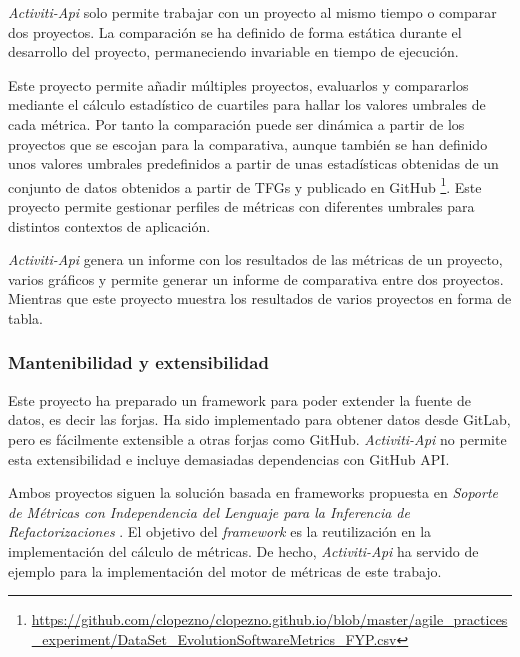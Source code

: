 \textit{Activiti-Api} solo permite trabajar con un proyecto al mismo tiempo o comparar dos proyectos. La comparación se ha definido de forma estática durante el desarrollo del proyecto, permaneciendo invariable en tiempo de ejecución.

Este proyecto permite añadir múltiples proyectos, evaluarlos y compararlos mediante el cálculo estadístico de cuartiles para hallar los valores umbrales de cada métrica. Por tanto la comparación puede ser dinámica a partir de los proyectos que se escojan para la comparativa, aunque también se han definido unos valores umbrales predefinidos a partir de unas estadísticas obtenidas de un conjunto de datos obtenidos a partir de TFGs y publicado en GitHub \footnote{\url{https://github.com/clopezno/clopezno.github.io/blob/master/agile_practices_experiment/DataSet_EvolutionSoftwareMetrics_FYP.csv}}. Este proyecto permite gestionar perfiles de métricas con diferentes umbrales para distintos contextos de aplicación.

\textit{Activiti-Api} genera un informe con los resultados de las métricas de un proyecto, varios gráficos y permite generar un informe de comparativa entre dos proyectos. Mientras que este proyecto muestra los resultados de varios proyectos en forma de tabla.

\subsubsection{Mantenibilidad y extensibilidad}

Este proyecto ha preparado un  framework para poder extender la fuente de datos, es decir las forjas. Ha sido implementado para obtener datos desde GitLab, pero es fácilmente extensible a otras forjas como GitHub. \textit{Activiti-Api} no permite esta extensibilidad e incluye demasiadas dependencias con GitHub API.

Ambos proyectos siguen la solución basada en frameworks propuesta en \textit{Soporte de Métricas con Independencia del Lenguaje para la Inferencia de Refactorizaciones} \cite{marticorena_soporte_2005}. El objetivo del \textit{framework} es la reutilización en la implementación del cálculo de métricas. De hecho, \textit{Activiti-Api} ha servido de ejemplo para la implementación del motor de métricas de este trabajo.

